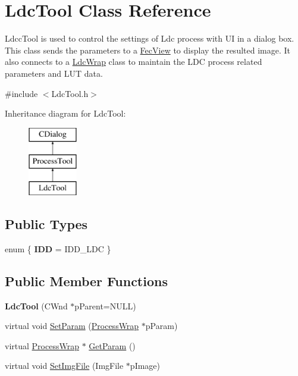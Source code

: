 \hypertarget{class_ldc_tool}{}\section{Ldc\+Tool Class Reference}
\label{class_ldc_tool}


Ldcc\+Tool is used to control the settings of Ldc process with UI in a dialog box. This class sends the parameters to a \mbox{\hyperlink{class_fec_view}{Fec\+View}} to display the resulted image. It also connects to a \mbox{\hyperlink{class_ldc_wrap}{Ldc\+Wrap}} class to maintain the L\+DC process related parameters and L\+UT data.  




{\ttfamily \#include $<$Ldc\+Tool.\+h$>$}

Inheritance diagram for Ldc\+Tool\+:\begin{figure}[H]
\begin{center}
\leavevmode
\includegraphics[height=3.000000cm]{class_ldc_tool}
\end{center}
\end{figure}
\subsection*{Public Types}
\begin{DoxyCompactItemize}
\item 
\mbox{\label{class_ldc_tool_af2f77d69d4f8b26d5c400d16edbe88e1}} 
enum \{ {\bfseries I\+DD} = I\+D\+D\+\_\+\+L\+DC
 \}
\end{DoxyCompactItemize}
\subsection*{Public Member Functions}
\begin{DoxyCompactItemize}
\item 
\mbox{\label{class_ldc_tool_a136828a14c1f5cda892687c7b28ede87}} 
{\bfseries Ldc\+Tool} (C\+Wnd $\ast$p\+Parent=N\+U\+LL)
\item 
virtual void \mbox{\hyperlink{class_ldc_tool_a1c98303e0ab2dfea1f1dcca8f1548307}{Set\+Param}} (\mbox{\hyperlink{class_process_wrap}{Process\+Wrap}} $\ast$p\+Param)
\item 
virtual \mbox{\hyperlink{class_process_wrap}{Process\+Wrap}} $\ast$ \mbox{\hyperlink{class_ldc_tool_af9828a2daf501b328a07dd8fa3d6abeb}{Get\+Param}} ()
\item 
virtual void \mbox{\hyperlink{class_ldc_tool_a07d1a547f02d4dea6a480c1be875a685}{Set\+Img\+File}} (Img\+File $\ast$p\+Image)
\end{DoxyCompactItemize}
